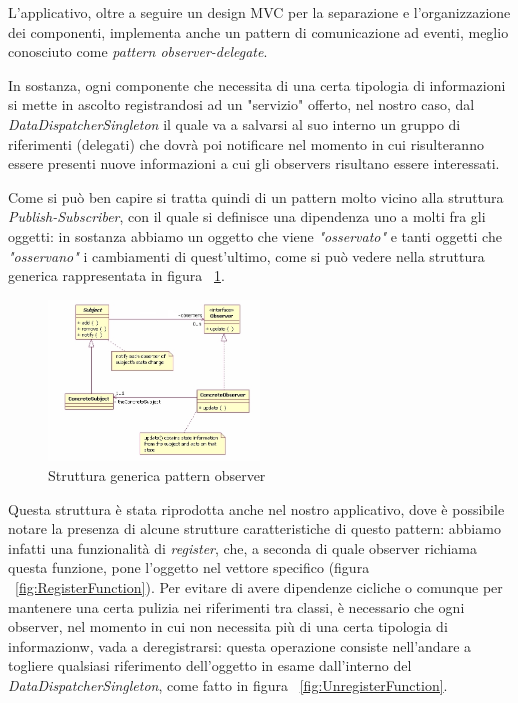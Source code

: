 L'applicativo, oltre a seguire un design MVC per la separazione e l'organizzazione dei componenti, implementa anche un pattern di comunicazione ad eventi, meglio conosciuto come \textit{pattern observer-delegate}. 

In sostanza, ogni componente che necessita di una certa tipologia di informazioni si mette in ascolto registrandosi ad un "servizio" offerto, nel nostro caso, dal \textit{DataDispatcherSingleton} il quale va a salvarsi al suo interno un gruppo di riferimenti (delegati) che dovrà poi notificare nel momento in cui risulteranno essere presenti nuove informazioni a cui gli observers risultano essere interessati.

Come si può ben capire si tratta quindi di un pattern molto vicino alla struttura \textit{Publish-Subscriber}, con il quale si definisce una dipendenza uno a molti fra gli oggetti: in sostanza abbiamo un oggetto che viene \textit{"osservato"} e tanti oggetti che \textit{"osservano"} i cambiamenti di quest'ultimo, come si può vedere nella struttura generica rappresentata in figura ~\ref{fig:ObserverStructure}.

\begin{figure}[h]
	\centering
	\includegraphics[width=0.5\textwidth]{Immagini/Observer/ObserverTheory.jpg}
	\caption{Struttura generica pattern observer}
	\label{fig:ObserverStructure}
\end{figure}

Questa struttura è stata riprodotta anche nel nostro applicativo, dove è possibile notare la presenza di alcune strutture caratteristiche di questo pattern: abbiamo infatti una funzionalità di \textit{register}, che, a seconda di quale observer richiama questa funzione, pone l'oggetto nel vettore specifico (figura ~\ref{fig:RegisterFunction}). 
Per evitare di avere dipendenze cicliche o comunque per mantenere una certa pulizia nei riferimenti tra classi, è necessario che ogni observer, nel momento in cui non necessita più di una certa tipologia di informazionw, vada a deregistrarsi: questa operazione consiste nell'andare a togliere qualsiasi riferimento dell'oggetto in esame dall'interno del \textit{DataDispatcherSingleton}, come fatto in figura ~\ref{fig:UnregisterFunction}.


